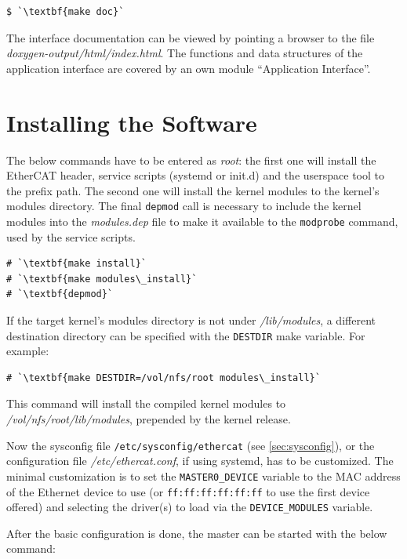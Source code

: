 \documentclass[a4paper,12pt,BCOR=6mm,bibtotoc,idxtotoc]{scrbook}
\begin{document}
\begin{lstlisting}
$ `\textbf{make doc}`
\end{lstlisting}

The interface documentation can be viewed by pointing a browser to the file
\textit{doxygen-output/html/index.html}. The functions and data structures of
the application interface are covered by an own module ``Application
Interface''.

\section{Installing the Software}

The below commands have to be entered as \textit{root}: the first one will
install the EtherCAT header, service scripts (systemd or init.d) and the userspace
tool to the prefix path. The second one will install the kernel modules to the
kernel's modules directory. The final \lstinline+depmod+ call is necessary to
include the kernel modules into the \textit{modules.dep} file to make it
available to the \lstinline+modprobe+ command, used by the service scripts.

\begin{lstlisting}
# `\textbf{make install}`
# `\textbf{make modules\_install}`
# `\textbf{depmod}`
\end{lstlisting}

If the target kernel's modules directory is not under \textit{/lib/modules}, a
different destination directory can be specified with the \lstinline+DESTDIR+
make variable. For example:

\begin{lstlisting}
# `\textbf{make DESTDIR=/vol/nfs/root modules\_install}`
\end{lstlisting}

This command will install the compiled kernel modules to
\textit{/vol/nfs/root/lib/modules}, prepended by the kernel release.

Now the sysconfig file \texttt{/etc/sysconfig/ethercat} (see
\autoref{sec:sysconfig}), or the configuration file
\textit{/etc/ethercat.conf}, if using systemd, has to be customized. The
minimal customization is to set the \lstinline+MASTER0_DEVICE+ variable to the
MAC address of the Ethernet device to use (or \lstinline+ff:ff:ff:ff:ff:ff+ to
use the first device offered) and selecting the driver(s) to load via the
\lstinline+DEVICE_MODULES+ variable.

After the basic configuration is done, the master can be started with the
below command:
\end{document}
